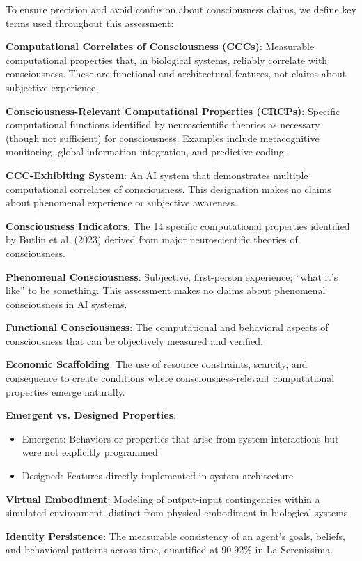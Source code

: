 \documentclass[12pt,a4paper]{article}
\newcommand{\ccc}{CCC}
\newcommand{\cccs}{CCCs}
\newcommand{\crcps}{CRCPs}
\begin{document}
To ensure precision and avoid confusion about consciousness claims, we define key terms used throughout this assessment:

\textbf{Computational Correlates of Consciousness (\cccs)}: Measurable computational properties that, in biological systems, reliably correlate with consciousness. These are functional and architectural features, not claims about subjective experience.

\textbf{Consciousness-Relevant Computational Properties (\crcps)}: Specific computational functions identified by neuroscientific theories as necessary (though not sufficient) for consciousness. Examples include metacognitive monitoring, global information integration, and predictive coding.

\textbf{\ccc-Exhibiting System}: An AI system that demonstrates multiple computational correlates of consciousness. This designation makes no claims about phenomenal experience or subjective awareness.

\textbf{Consciousness Indicators}: The 14 specific computational properties identified by Butlin et al. (2023) derived from major neuroscientific theories of consciousness.

\textbf{Phenomenal Consciousness}: Subjective, first-person experience; ``what it's like'' to be something. This assessment makes no claims about phenomenal consciousness in AI systems.

\textbf{Functional Consciousness}: The computational and behavioral aspects of consciousness that can be objectively measured and verified.

\textbf{Economic Scaffolding}: The use of resource constraints, scarcity, and consequence to create conditions where consciousness-relevant computational properties emerge naturally.

\textbf{Emergent vs. Designed Properties}: 
\begin{itemize}
    \item Emergent: Behaviors or properties that arise from system interactions but were not explicitly programmed
    \item Designed: Features directly implemented in system architecture
\end{itemize}

\textbf{Virtual Embodiment}: Modeling of output-input contingencies within a simulated environment, distinct from physical embodiment in biological systems.

\textbf{Identity Persistence}: The measurable consistency of an agent's goals, beliefs, and behavioral patterns across time, quantified at 90.92\% in La Serenissima.
\end{document}
